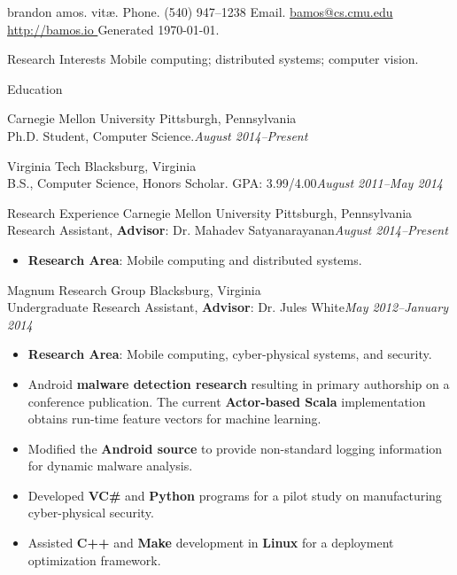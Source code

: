 \documentclass[letter]{article}
\begin{document}
{\huge brandon amos. vit\ae.} \hfill
{Phone.} {\small (540) 947--1238} \hspace{2mm}
{Email.} {\small \href{mailto: bamos@cs.cmu.edu }{ bamos@cs.cmu.edu }} \\
\url{ http://bamos.io } \hfill Generated \today.
\vspace{3mm}

\medskip

\begin{minipage}{\textwidth}
  {\huge Research Interests }
  Mobile computing; distributed systems; computer vision.
  \bigskip
\end{minipage}\medskip

\begin{minipage}{\textwidth}
  {\huge Education }

  {\large Carnegie Mellon University } \hfill Pittsburgh, Pennsylvania \\
  Ph.D. Student, Computer Science.\hfill {\it August 2014--Present}
  \bigskip

  {\large Virginia Tech } \hfill Blacksburg, Virginia \\
  B.S., Computer Science, Honors Scholar.
    GPA: 3.99/4.00\hfill {\it August 2011--May 2014}
  \bigskip
\end{minipage}\medskip

\begin{minipage}{\textwidth}
{\huge Research Experience }
{\large Carnegie Mellon University } \hfill Pittsburgh, Pennsylvania \\
Research Assistant, {\bf Advisor}: Dr. Mahadev Satyanarayanan\hfill {\it August 2014--Present}
\begin{itemize}
  \item {\bf Research Area}: Mobile computing and distributed systems.
\end{itemize}
\end{minipage}

\begin{minipage}{\textwidth}
\bigskip
{\large Magnum Research Group } \hfill Blacksburg, Virginia \\
Undergraduate Research Assistant, {\bf Advisor}: Dr. Jules White\hfill {\it May 2012--January 2014}
\begin{itemize}
  \item {\bf Research Area}: Mobile computing, cyber-physical systems, and security.
  \item Android {\bf malware detection research} resulting in primary authorship on a conference publication. The current {\bf Actor-based Scala} implementation obtains run-time feature vectors for machine learning.
  \item Modified the {\bf Android source} to provide non-standard logging information for dynamic malware analysis.
  \item Developed {\bf VC\#} and {\bf Python} programs for a pilot study on manufacturing cyber-physical security.
  \item Assisted {\bf C++} and {\bf Make} development in {\bf Linux} for a deployment optimization framework.
\end{itemize}
\end{minipage}
\end{document}
